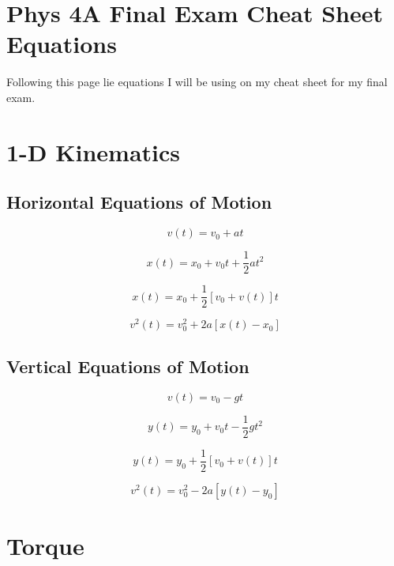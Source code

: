 \chapter*{Phys 4A Final Exam Cheat Sheet Equations}

Following this page lie equations I will be using on my cheat sheet
for my final exam.

\chapter*{1-D Kinematics}
\section*{Horizontal Equations of Motion}
  \begin{equation*}
    v(t) = v_0 + at
  \end{equation*}

  \begin{equation*}
    x(t) = x_0 + v_0t + \frac{1}{2}at^2
  \end{equation*}

  \begin{equation*}
    x(t) = x_0 + \frac{1}{2}[v_0 + v(t)]t
  \end{equation*}

  \begin{equation*}
    v^2(t) = v^2_0 + 2a[x(t) - x_0]
  \end{equation*}

\section*{Vertical Equations of Motion}

  \begin{equation*}
    v(t) = v_0 - gt
  \end{equation*}

  \begin{equation*}
    y(t) = y_0 + v_0t - \frac{1}{2}gt^2
  \end{equation*}

  \begin{equation*}
    y(t) = y_0 + \frac{1}{2}[v_0 + v(t)]t
  \end{equation*}

  \begin{equation*}
    v^2(t) = v^2_0 - 2a[y(t) - y_0]
  \end{equation*}

\chapter*{Torque}

